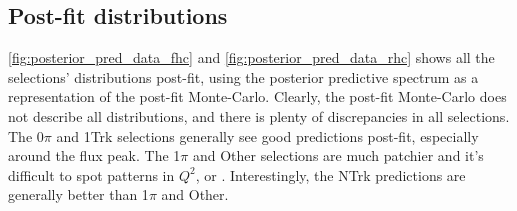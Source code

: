 \subsection{Post-fit distributions}
\autoref{fig:posterior_pred_data_fhc} and \autoref{fig:posterior_pred_data_rhc} shows all the selections' \pmu \cosmu distributions post-fit, using the posterior predictive spectrum as a representation of the post-fit Monte-Carlo. Clearly, the post-fit Monte-Carlo does not describe all distributions, and there is plenty of discrepancies in all selections. The 0$\pi$ and 1Trk selections generally see good predictions post-fit, especially around the flux peak. The 1$\pi$ and Other selections are much patchier and it's difficult to spot patterns in $Q^2$, \pmu or \cosmu. Interestingly, the NTrk predictions are generally better than 1$\pi$ and Other.

